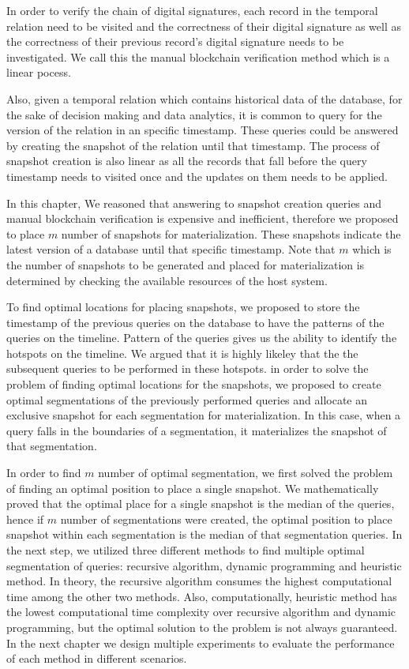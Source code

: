 		In order to verify the chain of digital signatures, each record in the temporal relation need to be visited and the correctness of their digital signature as well as the correctness of their previous record's digital signature needs to be investigated. We call this the manual blockchain verification method which is a linear pocess. 

		Also, given a temporal relation which contains historical data of the database, for the sake of decision making and data analytics, it is common to query for the version of the relation in an specific timestamp. These queries could be answered by creating the snapshot of the relation until that timestamp. The process of snapshot creation is also linear as all the records that fall before the query timestamp needs to visited once and the updates on them needs to be applied.

		In this chapter, We reasoned that answering to snapshot creation queries and manual blockchain verification is expensive and inefficient, therefore we proposed to place $m$ number of snapshots for materialization. These snapshots indicate the latest version of a database until that specific timestamp. Note that $m$ which is the number of snapshots to be generated and placed for materialization is determined by checking the available resources of the host system.

		To find optimal locations for placing snapshots, we proposed to store the timestamp of the previous queries on the database to have the patterns of the queries on the timeline. Pattern of the queries gives us the ability to identify the hotspots on the timeline. We argued that it is highly likeley that the the subsequent queries to be performed in these hotspots. in order to solve the problem of finding optimal locations for the snapshots, we proposed to create optimal segmentations of the previously performed queries and allocate an exclusive snapshot for each segmentation for materialization. In this case, when a query falls in the boundaries of a segmentation, it materializes the snapshot of that segmentation.

		In order to find $m$ number of optimal segmentation, we first solved the problem of finding an optimal position to place a single snapshot. We mathematically proved that the optimal place for a single snapshot is the median of the queries, hence if $m$ number of segmentations were created, the optimal position to place snapshot within each segmentation is the median of that segmentation queries. In the next step, we utilized three different methods to find multiple optimal segmentation of queries: recursive algorithm, dynamic programming and heuristic method. In theory, the recursive algorithm consumes the highest computational time among the other two methods. Also, computationally, heuristic method has the lowest computational time complexity over recursive algorithm and dynamic programming, but the optimal solution to the problem is not always guaranteed. In the next chapter we design multiple experiments to evaluate the performance of each method in different scenarios.

